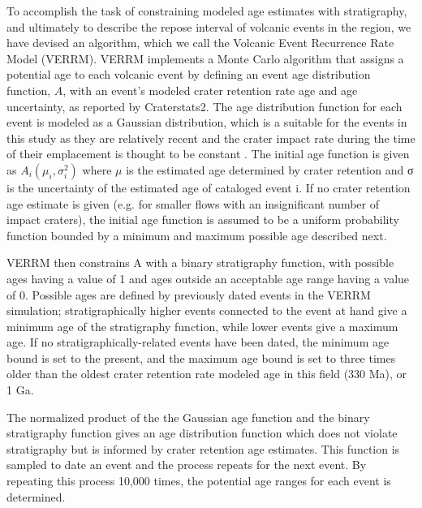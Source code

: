 \documentclass[12pt,letter]{article}
\begin{document}
To accomplish the task of constraining modeled age estimates with stratigraphy, and ultimately to describe the repose interval of volcanic events in the region, we have devised an algorithm, which we call the Volcanic Event Recurrence Rate Model (VERRM). VERRM implements a Monte Carlo algorithm that assigns a potential age to each volcanic event by defining an event age distribution function, $A$, with an event's modeled crater retention rate age and age uncertainty, as reported by Craterstats2. The age distribution function for each event is modeled as a Gaussian distribution, which is a suitable for the events in this study as they are relatively recent and the crater impact rate during the time of their emplacement is thought to be constant \citep{vaucher2009volcanic}. The initial age function is given as $A_i(\mu_i,\sigma_i^2)$ where $\mu$ is the estimated age determined by crater retention and σ is the uncertainty of the estimated age of cataloged event i. If no crater retention age estimate is given (e.g. for smaller flows with an insignificant number of impact craters), the initial age function is assumed to be a uniform probability function bounded by a minimum and maximum possible age described next.

VERRM then constrains A with a binary stratigraphy function, with possible ages having a value of 1 and ages outside an acceptable age range having a value of 0. Possible ages are defined by previously dated events in the VERRM simulation; stratigraphically higher events connected to the event at hand give a minimum age of the stratigraphy function, while lower events give a maximum age. If no stratigraphically-related events have been dated, the minimum age bound is set to the present, and the maximum age bound is set to three times older than the oldest crater retention rate modeled age in this field (330 Ma), or 1 Ga.

The normalized product of the the Gaussian age function and the binary stratigraphy function gives an age distribution function which does not violate stratigraphy but is informed by crater retention age estimates. This function is sampled to date an event and the process repeats for the next event. By repeating this process 10,000 times, the potential age ranges for each event is determined.
\end{document}
